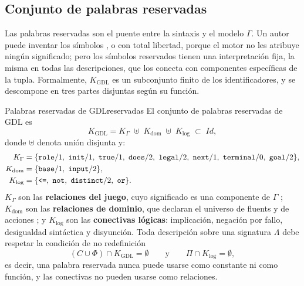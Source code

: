 \subsection{Conjunto de palabras reservadas}
\label{subsec:an_reservadas}

Las palabras reservadas son el puente entre la sintaxis y el modelo $\Gamma$. Un autor puede inventar los símbolos ,  o  con total libertad, porque el motor no les atribuye ningún significado; pero los símbolos reservados tienen una interpretación fija, la misma en todas las descripciones, que los conecta con componentes específicas de la tupla. Formalmente, $K_{\mathrm{GDL}}$ es un subconjunto finito de los identificadores, y se descompone en tres partes disjuntas según su función.

\begin{definicion}{Palabras reservadas de GDL}{reservadas}
El conjunto de palabras reservadas de GDL es
\begin{equation}
    K_{\mathrm{GDL}} = K_{\Gamma} \;\uplus\; K_{\mathrm{dom}} \;\uplus\; K_{\mathrm{log}} \;\subset\; \mathit{Id},
    \label{eq:an_K}
\end{equation}
donde $\uplus$ denota unión disjunta y:
\begin{align}
    K_{\Gamma} &= \{\kw{role}/1,\ \kw{init}/1,\ \kw{true}/1,\ \kw{does}/2,\ \kw{legal}/2,\ \kw{next}/1,\ \kw{terminal}/0,\ \kw{goal}/2\}, \label{eq:an_Kgamma}\\
    K_{\mathrm{dom}} &= \{\kw{base}/1,\ \kw{input}/2\}, \label{eq:an_Kdom}\\
    K_{\mathrm{log}} &= \{\kw{<=},\ \kw{not},\ \kw{distinct}/2,\ \kw{or}\}. \label{eq:an_Klog}
\end{align}
$K_{\Gamma}$ son las \textbf{relaciones del juego}, cuyo significado es una componente de $\Gamma$ \cite{Love2008GDL}; $K_{\mathrm{dom}}$ son las \textbf{relaciones de dominio}, que declaran el universo de fluents y de acciones \cite{GeneserethThielscher2014}; y $K_{\mathrm{log}}$ son las \textbf{conectivas lógicas}: implicación, negación por fallo, desigualdad sintáctica y disyunción. Toda descripción sobre una signatura $\Lambda$ debe respetar la condición de no redefinición
\begin{equation}
    (C \cup \Phi) \cap K_{\mathrm{GDL}} = \emptyset
    \qquad\text{y}\qquad
    \Pi \cap K_{\mathrm{log}} = \emptyset,
    \label{eq:an_no_redefinicion}
\end{equation}
es decir, una palabra reservada nunca puede usarse como constante ni como función, y las conectivas no pueden usarse como relaciones.
\end{definicion}

